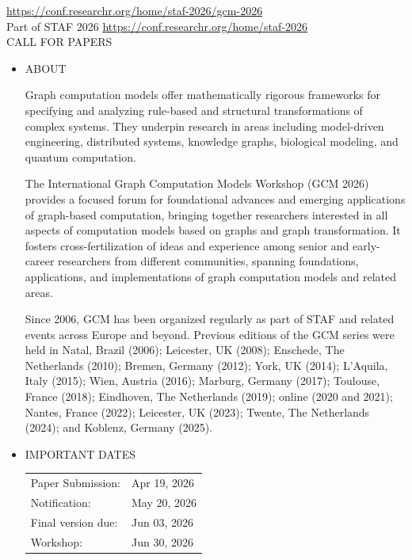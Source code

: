 \documentclass[prodmode,acmtecs]{acmsmall} %
\begin{document}
  \href{https://conf.researchr.org/home/staf-2026/gcm-2026}{https://conf.researchr.org/home/staf-2026/gcm-2026}\\ 
  Part of STAF 2026 \href{https://conf.researchr.org/home/staf-2026}{https://conf.researchr.org/home/staf-2026}\\ 
CALL FOR PAPERS 

\begin{itemize}\item  ABOUT  
 
  Graph computation models offer mathematically rigorous frameworks for specifying and analyzing rule-based and structural transformations of complex systems. They underpin research in areas including model-driven engineering, distributed systems, knowledge graphs, biological modeling, and quantum computation. 
 
  The International Graph Computation Models Workshop (GCM 2026) provides a focused forum for foundational advances and emerging applications of graph-based computation, bringing together researchers interested in all aspects of computation models based on graphs and graph transformation. It fosters cross-fertilization of ideas and experience among senior and early-career researchers from different communities, spanning foundations, applications, and implementations of graph computation models and related areas. 
 
  Since 2006, GCM has been organized regularly as part of STAF and related events across Europe and beyond. Previous editions of the GCM series were held in Natal, Brazil (2006); Leicester, UK (2008); Enschede, The Netherlands (2010); Bremen, Germany (2012); York, UK (2014); L'Aquila, Italy (2015); Wien, Austria (2016); Marburg, Germany (2017); Toulouse, France (2018); Eindhoven, The Netherlands (2019); online (2020 and 2021); Nantes, France (2022); Leicester, UK (2023); Twente, The Netherlands (2024); and Koblenz, Germany (2025). 
 
\item  IMPORTANT DATES 
 
\begin{tabulary}{\linewidth}{LL}Paper Submission:  & Apr 19, 2026 \\
Notification:  & May 20, 2026 \\
Final version due:  & Jun 03, 2026 \\
Workshop:  & Jun 30, 2026 \\
\end{tabulary}
 

\end{itemize}
\end{document}
